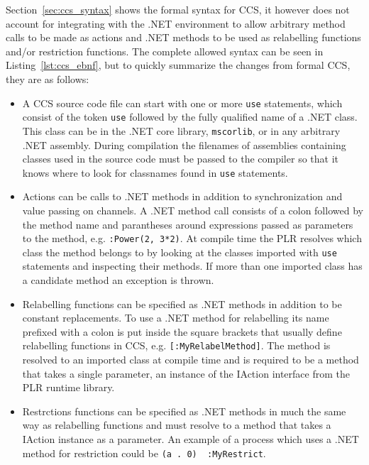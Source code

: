 	Section~\ref{sec:ccs_syntax} shows the formal syntax for CCS, it however does not account for integrating with the .NET environment to allow arbitrary method calls to be made as actions and .NET methods to be used as relabelling functions and/or restriction functions. The complete allowed syntax can be seen in Listing~\ref{lst:ccs_ebnf}, but to quickly summarize the changes from formal CCS, they are as follows:
	
	\begin{itemize}
		
		\item A CCS source code file can start with one or more \texttt{use} 
		statements, which consist of the token \texttt{use} followed by the fully 
		qualified name of a .NET class. This class can be in the .NET core 
		library, \texttt{mscorlib}, or in any arbitrary .NET assembly. During 
		compilation the filenames of assemblies containing classes used in the 
		source code must be passed to the compiler so that it knows where to look 
		for classnames found in \texttt{use} statements.
	
		\item Actions can be calls to .NET methods in addition to synchronization 
		and value passing on channels. A .NET method call consists of a colon 
		followed by the method name and parantheses around expressions passed as 
		parameters to the method, e.g. \texttt{:Power(2, 3*2)}. At compile time 
		the PLR resolves which class the method belongs to by looking at the 
		classes imported with \texttt{use} statements and inspecting their 
		methods. If more than one imported class has a candidate method an 
		exception is thrown.
		
		\item Relabelling functions can be specified as .NET methods in addition 
		to be constant replacements. To use a .NET method for relabelling its name 
		prefixed with a colon is put inside the square brackets that usually 
		define relabelling functions in CCS, e.g. \texttt{[:MyRelabelMethod]}. The 
		method is resolved to an imported class at compile time and is required to 
		be a method that takes a single parameter, an instance of the 
		\textsf{IAction} interface from the PLR runtime library.
		
		\item Restrctions functions can be specified as .NET methods in much the 
		same way as relabelling functions and must resolve to a method that takes 
		a \textsf{IAction} instance as a parameter. An example of a process which 
		uses a .NET method for restriction could be \texttt{(a . 0) \ :MyRestrict}.
	\end{itemize}